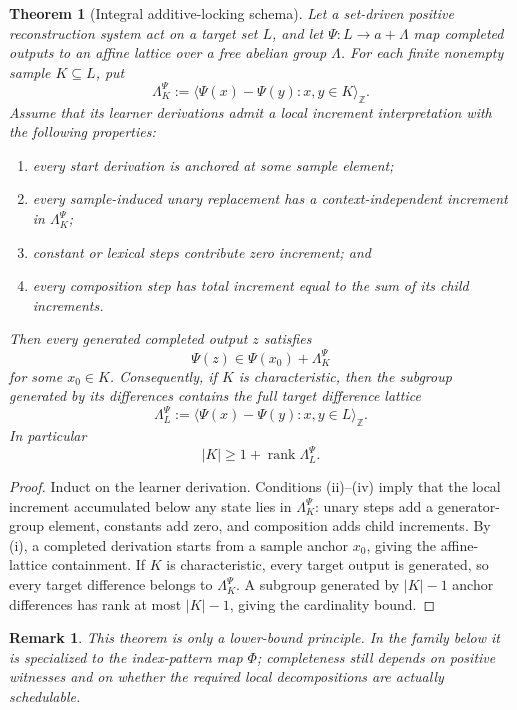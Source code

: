 \documentclass[11pt]{article}
\newtheorem{theorem}[definition]{Theorem}
\newtheorem{remark}[definition]{Remark}
\begin{document}
\begin{theorem}[Integral additive-locking schema]
\label{thm:additive-locking}
Let a set-driven positive reconstruction system act on a target set $L$, and
let $\Psi:L\to a+\Lambda$ map completed outputs to an affine lattice over a
free abelian group $\Lambda$.  For each finite nonempty sample $K\subseteq L$,
put
\[
 \Lambda_K^{\Psi}
 :=\langle\Psi(x)-\Psi(y):x,y\in K\rangle_{\mathbb Z}.
\]
Assume that its learner derivations admit a local increment interpretation with
the following properties:
\begin{enumerate}[label=\textup{(\roman*)},leftmargin=*]
\item every start derivation is anchored at some sample element;
\item every sample-induced unary replacement has a context-independent
increment in $\Lambda_K^{\Psi}$;
\item constant or lexical steps contribute zero increment; and
\item every composition step has total increment equal to the sum of its child
increments.
\end{enumerate}
Then every generated completed output $z$ satisfies
\[
 \boxed{
   \Psi(z)\in \Psi(x_0)+\Lambda_K^{\Psi}
 }
\]
for some $x_0\in K$.  Consequently, if $K$ is characteristic, then the subgroup
generated by its differences contains the full target difference lattice
\[
 \Lambda_L^{\Psi}:=
 \langle\Psi(x)-\Psi(y):x,y\in L\rangle_{\mathbb Z}.
\]
In particular
\[
 |K|\ge 1+\operatorname{rank}\Lambda_L^{\Psi}.
\]
\end{theorem}

\begin{proof}
Induct on the learner derivation.  Conditions (ii)--(iv) imply that the local
increment accumulated below any state lies in $\Lambda_K^{\Psi}$: unary steps
add a generator-group element, constants add zero, and composition adds child
increments.  By (i), a completed derivation starts from a sample anchor
$x_0$, giving the affine-lattice containment.  If $K$ is characteristic, every
target output is generated, so every target difference belongs to
$\Lambda_K^{\Psi}$.  A subgroup generated by $|K|-1$ anchor differences has
rank at most $|K|-1$, giving the cardinality bound.
\end{proof}

\begin{remark}
This theorem is only a lower-bound principle.  In the family below it is
specialized to the index-pattern map $\Phi$; completeness still depends on
positive witnesses and on whether the required local decompositions are
actually schedulable.
\end{remark}
\end{document}
